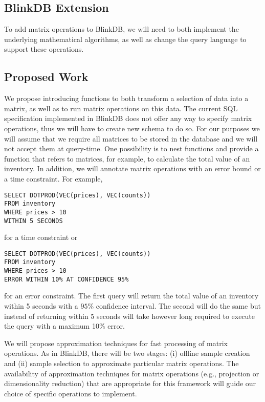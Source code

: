 \documentclass[twoside]{article}
\begin{document}
\begin{multicols}{2}
\section{BlinkDB Extension}
To add matrix operations to BlinkDB, we will need to both implement the underlying mathematical algorithms, as well as change the query language to support these operations. 
\subsection{Proposed Work}
We propose introducing functions to both transform a selection of data into a matrix, as well as to run matrix operations on this data. The current SQL specification implemented in BlinkDB does not offer any way to specify matrix operations, thus we will have to create new schema to do so. For our purposes we will assume that we require all matrices to be stored in the database and we will not accept them at query-time. One possibility is to nest functions and provide a function that refers to matrices, for example, to calculate the total value of an inventory. In addition, we will annotate matrix operations with an error bound or a time constraint. For example,

\begin{verbatim}
SELECT DOTPROD(VEC(prices), VEC(counts))
FROM inventory
WHERE prices > 10
WITHIN 5 SECONDS
\end{verbatim}

\noindent for a time constraint or

\begin{verbatim}
SELECT DOTPROD(VEC(prices), VEC(counts))
FROM inventory
WHERE prices > 10
ERROR WITHIN 10% AT CONFIDENCE 95%
\end{verbatim}

\noindent for an error constraint. The first query will return the total value of an inventory within 5 seconds with a $95 \%$ confidence interval. The second will do the same but instead of returning within 5 seconds will take however long required to execute the query with a maximum 10\% error.

We will propose approximation techniques for fast processing of matrix operations. As in BlinkDB, there will be two stages: (i) offline sample creation and (ii) sample selection to approximate particular matrix operations. The availability of approximation techniques for matrix operations (e.g., projection or dimensionality reduction) that are appropriate for this framework will guide our choice of specific operations to implement. 


\end{multicols}
\end{document}
